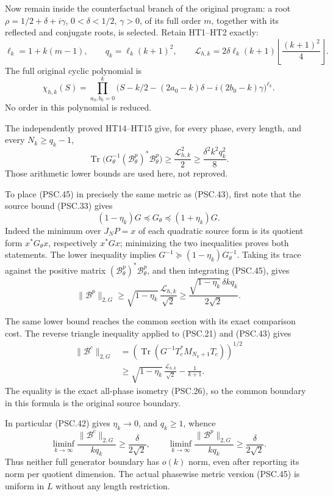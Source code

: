 Now remain inside the counterfactual branch of the original program: a root
\(\rho=1/2+\delta+i\gamma\), \(0<\delta<1/2\), \(\gamma>0\), of its full order \(m\), together with its reflected and conjugate roots, is selected. Retain HT1–HT2 exactly:
\[
 \ell_k=1+k(m-1),\qquad q_k=\ell_k(k+1)^2,\qquad
 \mathcal L_{h,k}
 =2\delta\ell_k(k+1)
        \left\lfloor\frac{(k+1)^2}{4}\right\rfloor.
 \tag{PSC.44}
\]
The full original cyclic polynomial is
\[
 \chi_{h,k}(S)
 =\prod_{a_0,b_0=0}^k
 \bigl(S-k/2-(2a_0-k)\delta-i(2b_0-k)\gamma\bigr)^{\ell_k}.
 \]
No order in this polynomial is reduced.

The independently proved HT14–HT15 give, for every phase, every length, and every \(N_k\geq q_k-1\),
\[
 \operatorname{Tr}\bigl(
     G_\theta^{-1}(\mathscr B^p_\theta)^*\mathscr B^p_\theta\bigr)
 \geq\frac{\mathcal L_{h,k}^2}{2}
 \geq\frac{\delta^2 k^2q_k^2}{8}.
 \tag{PSC.45}
\]
Those arithmetic lower bounds are used here, not reproved.

To place (PSC.45) in precisely the same metric as (PSC.43), first note that the source bound (PSC.33) gives
\[
 (1-\eta_k)G\preceq G_\theta\preceq(1+\eta_k)G.
 \tag{PSC.46}
\]
Indeed the minimum over \(J_NP=x\) of each quadratic source form is its quotient form \(x^*G_\theta x\), respectively \(x^*Gx\); minimizing the two inequalities proves both statements. The lower inequality implies
\(G^{-1}\succeq(1-\eta_k)G_\theta^{-1}\).
Taking its trace against the positive matrix
\((\mathscr B^p_\theta)^*\mathscr B^p_\theta\), and then integrating (PSC.45), gives
\[
 \|\mathscr B^p\|_{2,G}
 \geq\sqrt{1-\eta_k}\,
       \frac{\mathcal L_{h,k}}{\sqrt2}
 \geq\frac{\sqrt{1-\eta_k}\,\delta kq_k}{2\sqrt2}.
 \tag{PSC.47}
\]

The same lower bound reaches the common section with its exact comparison cost. The reverse triangle inequality applied to (PSC.21) and (PSC.43) gives
\[
 \boxed{
 \begin{aligned}
 \|\mathscr B^c\|_{2,G}
 &=\left(\operatorname{Tr}
      (G^{-1}T_c^*M_{N_k+1}T_c)\right)^{1/2}\\
 &\geq\sqrt{1-\eta_k}\,
       \frac{\mathcal L_{h,k}}{\sqrt2}-\frac1{k+1}.
 \end{aligned}}
 \tag{PSC.48}
\]
The equality is the exact all-phase isometry (PSC.26), so the common boundary in this formula is the original source boundary.

In particular (PSC.42) gives \(\eta_k\to0\), and \(q_k\geq1\), whence
\[
 \liminf_{k\to\infty}
 \frac{\|\mathscr B^c\|_{2,G}}{kq_k}
 \geq\frac{\delta}{2\sqrt2},\qquad
 \liminf_{k\to\infty}
 \frac{\|\mathscr B^p\|_{2,G}}{kq_k}
 \geq\frac{\delta}{2\sqrt2}.
 \tag{PSC.49}
\]
Thus neither full generator boundary has \(o(k)\) norm, even after reporting its norm per quotient dimension. The actual phasewise metric version (PSC.45) is uniform in \(L\) without any length restriction.

